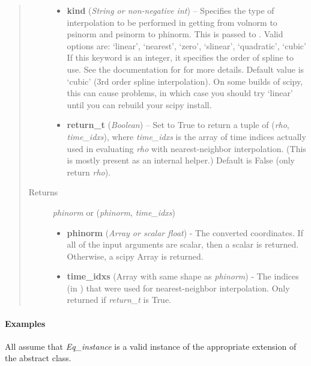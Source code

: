\documentclass[letterpaper,10pt,english]{sphinxmanual}
\begin{document}
\begin{fulllineitems}
\begin{fulllineitems}
\begin{quote}
\begin{description}
\begin{itemize}
\item {} 
\textbf{kind} (\emph{String or non-negative int}) --
Specifies the type of
interpolation to be performed in getting from volnorm to
psinorm and psinorm to phinorm. This is passed to
. Valid options are:
`linear', `nearest', `zero', `slinear', `quadratic', `cubic'
If this keyword is an integer, it specifies the order of spline
to use. See the documentation for  for more
details. Default value is `cubic' (3rd order spline
interpolation). On some builds of scipy, this can cause problems,
in which case you should try `linear' until you can rebuild your
scipy install.

\item {} 
\textbf{return\_t} (\emph{Boolean}) --
Set to True to return a tuple of (\emph{rho},
\emph{time\_idxs}), where \emph{time\_idxs} is the array of time indices
actually used in evaluating \emph{rho} with nearest-neighbor
interpolation. (This is mostly present as an internal helper.)
Default is False (only return \emph{rho}).

\end{itemize}

\item[{Returns}] \leavevmode

\emph{phinorm} or (\emph{phinorm}, \emph{time\_idxs})
\begin{itemize}
\item {} 
\textbf{phinorm} (\emph{Array or scalar float}) - The converted coordinates. If
all of the input arguments are scalar, then a scalar is returned.
Otherwise, a scipy Array is returned.

\item {} 
\textbf{time\_idxs} (Array with same shape as \emph{phinorm}) - The indices
(in ) that were used for
nearest-neighbor interpolation. Only returned if \emph{return\_t} is
True.

\end{itemize}


\end{description}\end{quote}
\paragraph{Examples}

All assume that \emph{Eq\_instance} is a valid instance of the appropriate
extension of the {\hyperref[eqtools:eqtools.core.Equilibrium]{}} abstract class.


\end{fulllineitems}
\end{fulllineitems}
\end{document}
